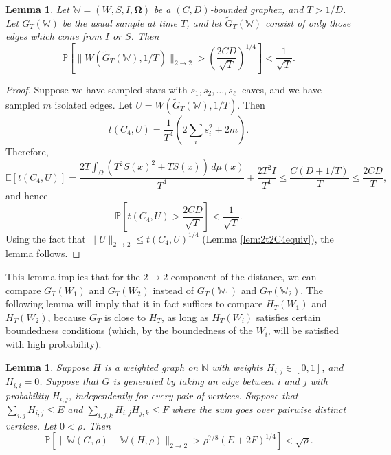 \documentclass{amsart}
\numberwithin{equation}{section}
\numberwithin{figure}{section}
\newtheorem{lemma}[theorem]{Lemma}
\theoremstyle{definition}
\theoremstyle{remark}
\newcommand{\bOmega}{{\mathbf{\Omega}}}
\newcommand{\EE}{\mathbb{E}}
\newcommand{\PP}{\mathbb{P}}
\newcommand{\NN}{\mathbb{N}}
\newcommand{\cW}{\mathbb{W}}
\begin{document}
\begin{lemma} \label{lem:2to2closewithwithoutstars}
Let $\cW=(W,S,I,\bOmega)$ be a $(C,D)$-bounded graphex, and $T>1/D$. Let
$G_T(\cW)$ be the usual sample at time $T$, and let $\widetilde{G}_T(\cW)$
consist of only those edges which come from $I$ or $S$. Then
\[
\PP\left[\|W(\widetilde{G}_T(\cW),1/T)\|_{2 \rightarrow 2}>\left(\frac{2CD}{\sqrt{T}}\right)^{1/4}\right] < \frac{1}{\sqrt{T}}.
\]
\end{lemma}

\begin{proof}
Suppose we have sampled stars with $s_1,s_2,\dots,s_\ell$ leaves, and we have
sampled $m$ isolated edges. Let $U=W(\widetilde{G}_T(\cW),1/T)$. Then
\[t(C_4,U)=\frac{1}{T^4} \left(2\sum_i s_i^2 + 2m \right)
.\]
Therefore,
\[\EE[t(C_4,U)]=\frac{2T\int_\Omega (T^2S(x)^2 + T S(x)) \,d\mu(x)}{T^4} + \frac{2T^2I}{T^4} \le \frac{C(D+1/T)}{T} \le \frac{2CD}{T},
\]
and hence
\[\PP\left[t(C_4,U)>\frac{2CD}{\sqrt{T}}\right] < \frac{1}{\sqrt{T}}
.\] Using the fact that $\|U\|_{2 \rightarrow 2} \le t(C_4,U)^{1/4}$ (Lemma
\ref{lem:2t2C4equiv}), the lemma follows.
\end{proof}

This lemma implies that for the $2 \rightarrow 2$ component of the distance,
we can compare $G_T(W_1)$ and $G_T(W_2)$ instead of $G_T(\cW_1)$ and
$G_T(\cW_2)$. The following lemma will imply that it in fact suffices to
compare $H_T(W_1)$ and $H_T(W_2)$, because $G_T$ is close to $H_T$, as long
as $H_T(W_i)$ satisfies certain boundedness conditions (which, by the
boundedness of the $W_i$, will be satisfied with high probability).

\begin{lemma} \label{lemmaweightunweightedclose}
Suppose $H$ is a weighted graph on $\NN$ with weights $H_{i,j}\in[0,1]$, and
$H_{i,i}=0$. Suppose that $G$ is generated by taking an edge between $i$ and
$j$ with probability $H_{i,j}$, independently for every pair of vertices.
Suppose that $\sum_{i,j} H_{i,j}\leq E$ and $\sum_{i,j,k}H_{i,j}H_{j,k}\leq
F$ where the sum goes over pairwise distinct vertices. Let $0<\rho$. Then
\[\PP[\|\cW(G,\rho)-\cW(H,\rho)\|_{2 \rightarrow 2}>\rho^{7/8}(E+2F)^{1/4}] < \sqrt{\rho}
.\]
\end{lemma}
\end{document}
